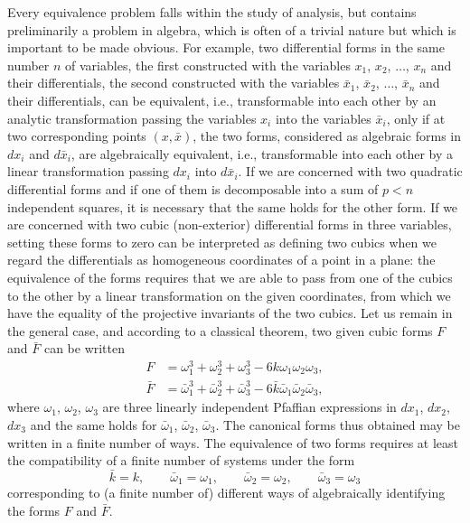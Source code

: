 \documentclass[leqno,11pt]{article}
\theoremstyle{shape1}
\theoremstyle{shape0}
\theoremstyle{shape2}
\theoremstyle{definition}
\begin{document}
Every equivalence problem falls within the study of analysis, but contains preliminarily a problem in algebra, which is often of a trivial nature but which is important to be made obvious. For example, two differential forms in the same number $n$ of variables, the first constructed with the variables $x_{1}$, $x_{2}$, $\dots$, $x_{n}$ and their differentials, the second constructed with the variables $\bar x_{1}$, $\bar x_{2}$, $\dots$, $\bar x_{n}$ and their differentials, can be equivalent, i.e., transformable into each other by an analytic transformation passing the variables $x_{i}$ into the variables $\bar x_{i}$, only if at two corresponding points $(x,\bar x)$, the two forms, considered as algebraic forms in $dx_{i}$ and $d\bar x_{i}$, are algebraically equivalent, i.e., transformable into each other by a linear transformation passing $dx_{i}$ into $d\bar x_{i}$. If we are concerned with two quadratic differential forms and if one of them is decomposable into a sum of $p<n$ independent squares, it is necessary that the same holds for the other form. If we are concerned with two cubic (non-exterior) differential forms in three variables, setting these forms to zero can be interpreted as defining two cubics when we regard the differentials as homogeneous coordinates of a point in a plane: the equivalence of the forms requires that we are able to pass from one of the cubics to the other by a linear transformation on the given coordinates, from which we have the equality of the projective invariants of the two cubics. Let us remain in the general case, and according to a classical theorem, two given cubic forms $F$ and $\bar F$ can be written
\begin{align*}
  F&=\omega_{1}^{3}+\omega_{2}^{3}+\omega_{3}^{3}-6k\omega_{1}\omega_{2}\omega_{3},\\
  \bar F&=\bar\omega_{1}^{3}+\bar\omega_{2}^{3}+\bar\omega_{3}^{3}-6\bar k\bar\omega_{1}\bar\omega_{2}\bar\omega_{3},
\end{align*}
where $\omega_{1}$, $\omega_{2}$, $\omega_{3}$ are three linearly independent Pfaffian expressions in $dx_{1}$, $dx_{2}$, $dx_{3}$ and the same holds for $\bar\omega_{1}$, $\bar\omega_{2}$, $\bar\omega_{3}$. The canonical forms thus obtained may be written in a finite number of ways. The equivalence of two forms requires at least the compatibility of a finite number of systems under the form
\begin{equation}
  \label{eq:1}
  \bar k=k,\qquad\bar\omega_{1}=\omega_{1},\qquad\bar\omega_{2}=\omega_{2},\qquad\bar\omega_{3}=\omega_{3}
\end{equation}
corresponding to (a finite number of) different ways of algebraically identifying the forms $F$ and $\bar F$.
\end{document}
